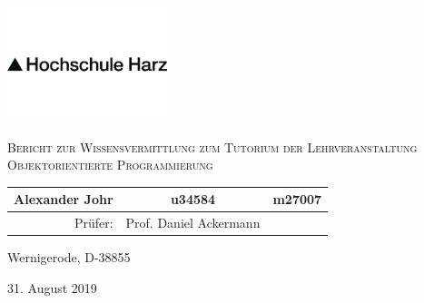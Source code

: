 

\pagestyle{empty}
\clearpage

\newcommand*{\titleUL}{\begingroup%
\begin{center}

\includegraphics[width=0.35\textwidth]{img/hsharz/logo.png}

\LARGE{\textsc{Bericht zur Wissensvermittlung zum Tutorium der Lehrveranstaltung Objektorientierte Programmierung}}
\vspace{0.8\baselineskip}

\vfill


\vfill

\normalsize


\begin{tabular}{r c l}
Alexander Johr & u34584 & m27007 \\
\hline
Prüfer: &  Prof. Daniel Ackermann & \\
\end{tabular}

  





\vfill

Wernigerode, D-38855

\large 
31. August 2019

\end{center}

\endgroup}

\titleUL
